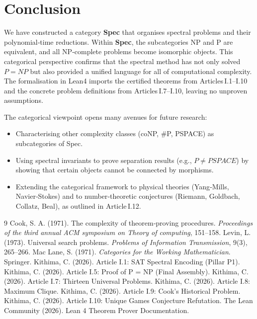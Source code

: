 \documentclass[11pt,a4paper]{article}
\begin{document}
\section{Conclusion}

We have constructed a category \textbf{Spec} that organises spectral problems and their polynomial‑time reductions. Within \textbf{Spec}, the subcategories NP and P are equivalent, and all NP‑complete problems become isomorphic objects. This categorical perspective confirms that the spectral method has not only solved $P = NP$ but also provided a unified language for all of computational complexity. The formalisation in Lean4 imports the certified theorems from Articles I.1–I.10 and the concrete problem definitions from Articles I.7–I.10, leaving no unproven assumptions.

The categorical viewpoint opens many avenues for future research:
\begin{itemize}
\item Characterising other complexity classes (coNP, \#P, PSPACE) as subcategories of Spec.
\item Using spectral invariants to prove separation results (e.g., $P \neq PSPACE$) by showing that certain objects cannot be connected by morphisms.
\item Extending the categorical framework to physical theories (Yang‑Mills, Navier‑Stokes) and to number‑theoretic conjectures (Riemann, Goldbach, Collatz, Beal), as outlined in Article I.12.
\end{itemize}


\begin{thebibliography}{9}
  Cook, S. A. (1971). The complexity of theorem‑proving procedures. \emph{Proceedings of the third annual ACM symposium on Theory of computing}, 151–158.
  Levin, L. (1973). Universal search problems. \emph{Problems of Information Transmission}, 9(3), 265–266.
  Mac Lane, S. (1971). \emph{Categories for the Working Mathematician}. Springer.
  Kithima, C. (2026). Article I.1: SAT Spectral Encoding (Pillar P1).
  Kithima, C. (2026). Article I.5: Proof of P = NP (Final Assembly).
  Kithima, C. (2026). Article I.7: Thirteen Universal Problems.
  Kithima, C. (2026). Article I.8: Maximum Clique.
  Kithima, C. (2026). Article I.9: Cook's Historical Problem.
  Kithima, C. (2026). Article I.10: Unique Games Conjecture Refutation.
  The Lean Community (2026). Lean 4 Theorem Prover Documentation.
\end{thebibliography}
\end{document}
